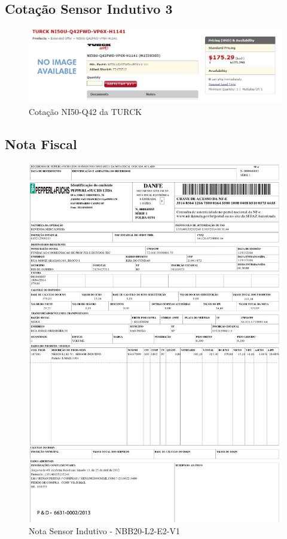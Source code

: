 \subsection{Cotação Sensor Indutivo 3 }
\begin{figure}[H]
 \centering
 \includegraphics[width=1\columnwidth]{Indutivo/price_quote_2}
 \caption{Cotação NI50-Q42 da TURCK }
\end{figure}

\subsection{Nota Fiscal}
\begin{figure}[H]
 \centering
 \includegraphics[width=1\columnwidth]{Indutivo/nota_indutivo.pdf}
 \caption{Nota Sensor Indutivo - NBB20-L2-E2-V1}
 \end{figure}